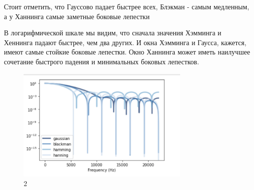 \documentclass[10pt,a4paper,oneside]{article}
\begin{document}
Стоит отметить, что Гауссово падает быстрее всех, Блэкман - самым медленным, а у Ханнинга самые заметные боковые лепестки

В логарифмической шкале мы видим, что сначала значения Хэмминга и Хеннинга падают быстрее, чем два других. И окна Хэмминга и Гаусса, кажется, имеют самые стойкие боковые лепестки. Окно Ханнинга может иметь наилучшее сочетание быстрого падения и минимальных боковых лепестков.

\begin{figure}[H]
        \centering
        \includegraphics[width=0.75\textwidth]{pics/7.png}
        \caption{2}
        \label{fig:first}
\end{figure}
\end{document}
